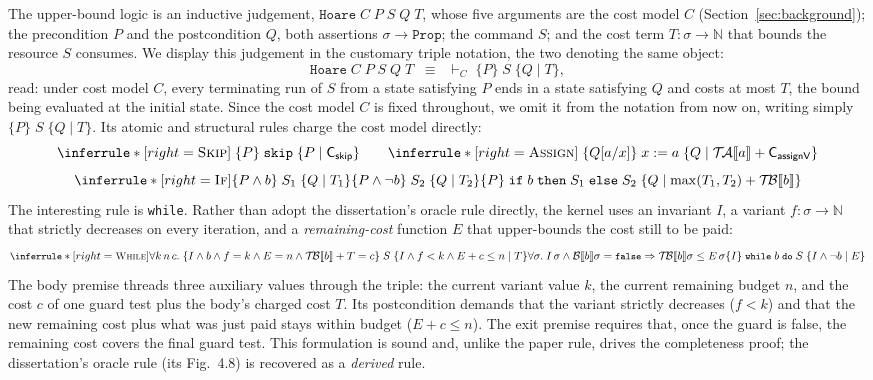 \documentclass[runningheads]{llncs}
\newcommand{\State}{\sigma}
\newcommand{\Nat}{\mathbb{N}}
\newcommand{\bval}[1]{\mathcal{B}\llbracket #1 \rrbracket}
\newcommand{\tacost}[1]{\mathcal{T\!A}\llbracket #1 \rrbracket}
\newcommand{\tbcost}[1]{\mathcal{T\!B}\llbracket #1 \rrbracket}
\newcommand{\triple}[4]{\{#1\}\;#2\;\{#3 \mid #4\}}
\newcommand{\subst}[3]{#1[#2/#3]}
\newcommand{\cst}[1]{\mathsf{C_{#1}}}
\newcommand{\code}[1]{\texttt{#1}}
\begin{document}
The upper-bound logic is an inductive judgement, $\code{Hoare}\;C\;P\;S\;Q\;T$,
whose five arguments are the cost model $C$ (Section~\ref{sec:background}); the
precondition $P$ and the postcondition $Q$, both assertions $\State \to
\code{Prop}$; the command $S$; and the cost term $T : \State \to \Nat$ that bounds
the resource $S$ consumes.
We display this judgement in the customary triple notation, the two denoting the
same object:
\[
\code{Hoare}\;C\;P\;S\;Q\;T
\;\;\equiv\;\;
{\vdash_{C}}\;\triple{P}{S}{Q}{T},
\]
read: under cost model $C$, every terminating run of $S$ from a state satisfying
$P$ ends in a state satisfying $Q$ and costs at most $T$, the bound being
evaluated at the initial state.
Since the cost model $C$ is fixed throughout, we omit it from the notation from
now on, writing simply $\triple{P}{S}{Q}{T}$.
Its atomic and structural rules charge the cost
model directly:
\[
\inferrule*[right=\textsc{Skip}]{\;}{\triple{P}{\code{skip}}{P}{\cst{skip}}}
\qquad
\inferrule*[right=\textsc{Assign}]{\;}
{\triple{\subst{Q}{a}{x}}{x := a}{Q}{\tacost{a} + \cst{assignV}}}
\]
\[
\inferrule*[right=\textsc{If}]
{\triple{P \wedge b}{S_1}{Q}{T_1} \\ \triple{P \wedge \neg
b}{S_2}{Q}{T_2}}
{\triple{P}{\code{if}\;b\;\code{then}\;S_1\;\code{else}\;S_2}{Q}
{\max(T_1, T_2) + \tbcost{b}}}
\]
The interesting rule is \code{while}.
Rather than adopt the dissertation's oracle rule directly, the kernel uses an
invariant $I$, a variant $f : \State \to \Nat$ that strictly decreases on every
iteration, and a \emph{remaining-cost} function $E$ that upper-bounds the cost
still to be paid:
\[
{\small
\inferrule*[right=\textsc{While}]
{ \forall k\,n\,c.\;
        \triple{I \wedge b \wedge f = k \wedge E = n
        \wedge \tbcost{b} + T = c}
        {S}
        {I \wedge f < k \wedge E + c \le n}{T}
        \\\\
        \forall\State.\; I\,\State \wedge
        \bval{b}\State = \code{false}
\Rightarrow \tbcost{b}\State \le E\,\State }
{\triple{I}{\code{while}\;b\;\code{do}\;S}{I \wedge \neg b}{E}}
}
\]
The body premise threads three auxiliary values through the triple: the current
variant value $k$, the current remaining budget $n$, and the cost $c$ of one
guard test plus the body's charged cost $T$.
Its postcondition demands that the variant strictly decreases ($f < k$) and that
the new remaining cost plus what was just paid stays within budget
($E + c \le n$).
The exit premise requires that, once the guard is false, the remaining cost
covers the final guard test.
This formulation is sound and, unlike the paper rule, drives the completeness
proof; the dissertation's oracle rule (its Fig.~4.8) is recovered as a
\emph{derived} rule.
\end{document}
